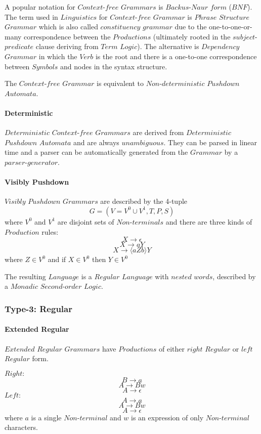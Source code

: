 \documentclass{article}
\begin{document}
A popular notation for $Context$-$free$ $Grammars$ is $Backus$-$Naur$
$form$ ($BNF$). The term used in $Linguistics$ for $Context$-$free$
$Grammar$ is $Phrase$ $Structure$ $Grammar$ which is also called
$constituency$ $grammar$ due to the one-to-one-or-many correspondence
between the $Productions$ (ultimately rooted in the
$subject$-$predicate$ clause deriving from $Term$ $Logic$). The
alternative is $Dependency$ $Grammar$ in which the $Verb$ is the root
and there is a one-to-one correspondence between $Symbols$ and nodes
in the syntax structure.

The $Context$-$free$ $Grammar$ is equivalent to $Non$-$deterministic$
$Pushdown$ $Automata$.

\paragraph{Deterministic}
$Deterministic$ $Context$-$free$ $Grammars$ are derived from
$Deterministic$ $Pushdown$ $Automata$ and are always
$unambiguous$. They can be parsed in linear time and a parser can be
automatically generated from the $Grammar$ by a $parser$-$generator$.

\paragraph{Visibly Pushdown}
$Visibly$ $Pushdown$ $Grammars$ are described by the 4-tuple
\[
    G = (V=V^0 \cup V^1,T,P,S)
\]
where $V^0$ and $V^1$ are disjoint sets of $Non$-$terminals$ and there
are three kinds of $Production$ rules:
\[
    X \rightarrow \epsilon
\]\[
    X \rightarrow aY
\]\[
    X \rightarrow \langle aZb \rangle Y
\]
where $Z \in V^0$ and if $X \in V^0$ then $Y \in V^0$

The resulting $Language$ is a $Regular$ $Language$ with $nested$
$words$, described by a $Monadic$ $Second$-$order$ $Logic$.

\subsubsection{Type-3: Regular}

\paragraph{Extended Regular}
$Extended$ $Regular$ $Grammars$ have $Productions$ of either $right$
$Regular$ or $left$ $Regular$ form.

$Right:$
\[
    B \rightarrow a
\]\[
    A \rightarrow Bw
\]\[
    A \rightarrow \epsilon
\]
$Left:$
\[
    A \rightarrow a
\]\[
    A \rightarrow Bw
\]\[
    A \rightarrow \epsilon
\]
where $a$ is a single $Non$-$terminal$ and $w$ is an expression of
only $Non$-$terminal$ characters.
\end{document}
